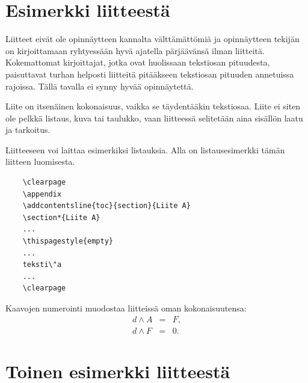 \documentclass[english,12pt,a4paper,pdftex,elec,utf8]{aaltothesis}
\begin{document}
\clearpage

\thesisappendix

\section{Esimerkki liitteest\"a\label{LiiteA}}

Liitteet eiv\"at ole opinn\"aytteen kannalta v\"altt\"am\"att\"omi\"a ja
opinn\"aytteen tekij\"an on
kirjoittamaan ryhtyess\"a\"an hyv\"a ajatella p\"arj\"a\"av\"ans\"a ilman liitteit\"a.
Kokemattomat kirjoittajat, jotka ovat huolissaan
tekstiosan pituudesta, paisuttavat turhan
helposti liitteit\"a pit\"a\"akseen tekstiosan pituuden annetuissa rajoissa.
T\"all\"a tavalla ei synny hyv\"a\"a opinn\"aytett\"a.

Liite on itsen\"ainen kokonaisuus, vaikka se t\"aydent\"a\"akin tekstiosaa.
Liite ei siten ole pelkk\"a listaus, kuva tai taulukko, vaan
liitteess\"a selitet\"a\"an aina sis\"all\"on laatu ja tarkoitus.

Liitteeseen voi laittaa esimerkiksi listauksia. Alla on
listausesimerkki t\"am\"an liitteen luomisesta.

\begin{verbatim}
	\clearpage
	\appendix
	\addcontentsline{toc}{section}{Liite A}
	\section*{Liite A}
	...
	\thispagestyle{empty}
	...
	teksti\"a
	...
	\clearpage
\end{verbatim}

Kaavojen numerointi muodostaa liitteiss\"a oman kokonaisuutensa:
\begin{eqnarray}
d \wedge A  &=& F, \label{liitekaava1}\\
d \wedge F  &=& 0. \label{liitekaava2}
\end{eqnarray}


\clearpage
\section{Toinen esimerkki liitteest\"a\label{LiiteB}}

\end{document}
